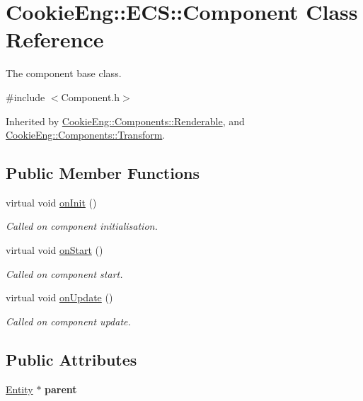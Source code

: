 \hypertarget{class_cookie_eng_1_1_e_c_s_1_1_component}{}\section{Cookie\+Eng\+:\+:E\+CS\+:\+:Component Class Reference}
\label{class_cookie_eng_1_1_e_c_s_1_1_component}


The component base class.  




{\ttfamily \#include $<$Component.\+h$>$}



Inherited by \hyperlink{class_cookie_eng_1_1_components_1_1_renderable}{Cookie\+Eng\+::\+Components\+::\+Renderable}, and \hyperlink{class_cookie_eng_1_1_components_1_1_transform}{Cookie\+Eng\+::\+Components\+::\+Transform}.

\subsection*{Public Member Functions}
\begin{DoxyCompactItemize}
\item 
virtual void \hyperlink{class_cookie_eng_1_1_e_c_s_1_1_component_a4b02b630558005a9c4723cf15b8b03d6}{on\+Init} ()
\begin{DoxyCompactList}\small\item\em Called on component initialisation. \end{DoxyCompactList}\item 
virtual void \hyperlink{class_cookie_eng_1_1_e_c_s_1_1_component_aaf8523586d57c3e40d4149f228755139}{on\+Start} ()
\begin{DoxyCompactList}\small\item\em Called on component start. \end{DoxyCompactList}\item 
virtual void \hyperlink{class_cookie_eng_1_1_e_c_s_1_1_component_a7c4a11f71e21181bc6f56841565b9a56}{on\+Update} ()
\begin{DoxyCompactList}\small\item\em Called on component update. \end{DoxyCompactList}\end{DoxyCompactItemize}
\subsection*{Public Attributes}
\begin{DoxyCompactItemize}
\item 
\mbox{\label{class_cookie_eng_1_1_e_c_s_1_1_component_a8a0c5a4ee3a87809d3e6d0bdaed3ebbe}} 
\hyperlink{class_cookie_eng_1_1_e_c_s_1_1_entity}{Entity} $\ast$ {\bfseries parent}
\end{DoxyCompactItemize}


